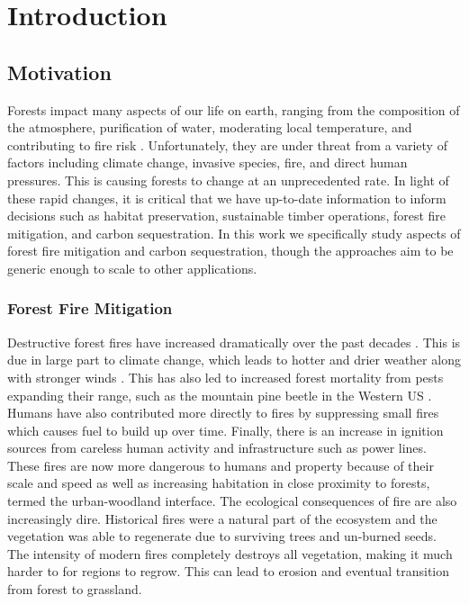 
\chapter{Introduction} \label{chapIntroduction}
\section{Motivation}

Forests impact many aspects of our life on earth, ranging from the composition of the atmosphere, purification of water, moderating local temperature, and contributing to fire risk \cite{IPCC2019ClimateReport}. Unfortunately, they are under threat from a variety of factors including climate change, invasive species, fire, and direct human pressures. This is causing forests to change at an unprecedented rate. In light of these rapid changes, it is critical that we have up-to-date information to inform decisions such as habitat preservation, sustainable timber operations, forest fire mitigation, and carbon sequestration. In this work we specifically study aspects of forest fire mitigation and carbon sequestration, though the approaches aim to be generic enough to scale to other applications. 

\subsection{Forest Fire Mitigation} 
Destructive forest fires have increased dramatically over the past decades \cite{spreading_like_wildfire, ayanz2021, nfn2022}. This is due in large part to climate change, which leads to hotter and drier weather along with stronger winds \cite{spreading_like_wildfire}. This has also led to increased forest mortality from pests expanding their range, such as the mountain pine beetle in the Western US \cite{Jenkins2014AndFuels}. Humans have also contributed more directly to fires by suppressing small fires which causes fuel to build up over time. Finally, there is an increase in ignition sources from careless human activity and infrastructure such as power lines. These fires are now more dangerous to humans and property because of their scale and speed as well as increasing habitation in close proximity to forests, termed the urban-woodland interface. The ecological consequences of fire are also increasingly dire. Historical fires were a natural part of the ecosystem and the vegetation was able to regenerate due to surviving trees and un-burned seeds. The intensity of modern fires completely destroys all vegetation, making it much harder to for regions to regrow. This can lead to erosion and eventual transition from forest to grassland.

